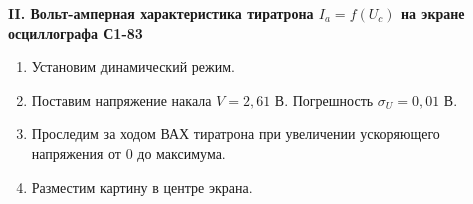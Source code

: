 	\begin{center}
		\textbf{II. Вольт-амперная характеристика тиратрона $I_a = f(U_c)$ на экране осциллографа С1-83}
	\end{center}

	\begin{enumerate}
		\item Установим динамический режим.
		
		\item Поставим напряжение накала $V = 2,61$ В. Погрешность $\sigma_U = 0,01$ В.
		
		\item Проследим за ходом ВАХ тиратрона при увеличении ускоряющего напряжения от 0 до максимума.
		
		\item Разместим картину в центре экрана.


\end{enumerate}

